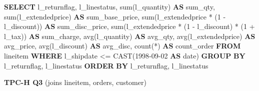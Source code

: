 \documentclass[
]{article}
\newenvironment{Shaded}{}{}
\newcommand{\DataTypeTok}[1]{\textcolor[rgb]{0.56,0.13,0.00}{#1}}
\newcommand{\DecValTok}[1]{\textcolor[rgb]{0.25,0.63,0.44}{#1}}
\newcommand{\FunctionTok}[1]{\textcolor[rgb]{0.02,0.16,0.49}{#1}}
\newcommand{\KeywordTok}[1]{\textcolor[rgb]{0.00,0.44,0.13}{\textbf{#1}}}
\newcommand{\NormalTok}[1]{#1}
\newcommand{\OperatorTok}[1]{\textcolor[rgb]{0.40,0.40,0.40}{#1}}
\newcommand{\StringTok}[1]{\textcolor[rgb]{0.25,0.44,0.63}{#1}}
\begin{document}
\begin{Shaded}
\begin{Highlighting}[]
\KeywordTok{SELECT}
\NormalTok{    l\_returnflag,}
\NormalTok{    l\_linestatus,}
    \FunctionTok{sum}\NormalTok{(l\_quantity) }\KeywordTok{AS}\NormalTok{ sum\_qty,}
    \FunctionTok{sum}\NormalTok{(l\_extendedprice) }\KeywordTok{AS}\NormalTok{ sum\_base\_price,}
    \FunctionTok{sum}\NormalTok{(l\_extendedprice }\OperatorTok{*}\NormalTok{ (}\DecValTok{1} \OperatorTok{{-}}\NormalTok{ l\_discount)) }\KeywordTok{AS}\NormalTok{ sum\_disc\_price,}
    \FunctionTok{sum}\NormalTok{(l\_extendedprice }\OperatorTok{*}\NormalTok{ (}\DecValTok{1} \OperatorTok{{-}}\NormalTok{ l\_discount) }\OperatorTok{*}\NormalTok{ (}\DecValTok{1} \OperatorTok{+}\NormalTok{ l\_tax)) }\KeywordTok{AS}\NormalTok{ sum\_charge,}
    \FunctionTok{avg}\NormalTok{(l\_quantity) }\KeywordTok{AS}\NormalTok{ avg\_qty,}
    \FunctionTok{avg}\NormalTok{(l\_extendedprice) }\KeywordTok{AS}\NormalTok{ avg\_price,}
    \FunctionTok{avg}\NormalTok{(l\_discount) }\KeywordTok{AS}\NormalTok{ avg\_disc,}
    \FunctionTok{count}\NormalTok{(}\OperatorTok{*}\NormalTok{) }\KeywordTok{AS}\NormalTok{ count\_order}
\KeywordTok{FROM}
\NormalTok{    lineitem}
\KeywordTok{WHERE}
\NormalTok{    l\_shipdate }\OperatorTok{\textless{}=} \FunctionTok{CAST}\NormalTok{(}\StringTok{\textquotesingle{}1998{-}09{-}02\textquotesingle{}} \KeywordTok{AS} \DataTypeTok{date}\NormalTok{)}
\KeywordTok{GROUP} \KeywordTok{BY}
\NormalTok{    l\_returnflag,}
\NormalTok{    l\_linestatus}
\KeywordTok{ORDER} \KeywordTok{BY}
\NormalTok{    l\_returnflag,}
\NormalTok{    l\_linestatus}
\end{Highlighting}
\end{Shaded}

\textbf{TPC-H Q3} (joins lineitem, orders, customer)
\end{document}
